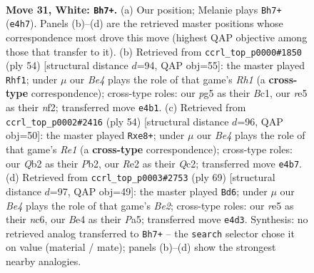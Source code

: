 \documentclass[11pt]{article}
\begin{document}
\clearpage

\begin{figure}[p]\centering
\begin{subfigure}{0.46\textwidth}\centering
\resizebox{\linewidth}{!}{%
\newchessgame
\chessboard[
  setfen={1nbq2k1/5p2/1p1P1n2/r3r1pp/p1P1B3/B5PP/PQ2RP2/R5K1 w - - 0 31},
  showmover=false,
  pgfstyle=straightmove, color=movearrow, markmove={e4-h7}
]}
\caption{}
\end{subfigure}\hfill
\begin{subfigure}{0.46\textwidth}\centering
\resizebox{\linewidth}{!}{%
\newchessgame
\chessboard[
  setfen={3k3r/2p1p1b1/8/r1qP1p1p/4p2P/1B3P2/1PP1QnP1/1KB1R2R w - - 3 28},
  showmover=false,
  pgfstyle=straightmove, color=movearrow, markmove={h1-f1}
]}
\caption{}
\end{subfigure}
\\[4pt]
\begin{subfigure}{0.46\textwidth}\centering
\resizebox{\linewidth}{!}{%
\newchessgame
\chessboard[
  setfen={3rr1k1/2q2pp1/p4n2/1pBp1P2/3b2Pp/5B1P/PPQ2P2/2R1R2K w - - 1 28},
  showmover=false,
  pgfstyle=straightmove, color=movearrow, markmove={e1-e8}
]}
\caption{}
\end{subfigure}\hfill
\begin{subfigure}{0.46\textwidth}\centering
\resizebox{\linewidth}{!}{%
\newchessgame
\chessboard[
  setfen={r3r1k1/1q2bp2/2N1p2p/pp6/3P1PPp/P4Q2/1PR4K/2R5 b - - 3 35},
  showmover=false,
  pgfstyle=straightmove, color=movearrow, markmove={e7-d6}
]}
\caption{}
\end{subfigure}
\caption{\textbf{Move 31, White: \texttt{Bh7+}.} (a) Our position; Melanie plays \texttt{Bh7+} (\texttt{e4h7}). Panels (b)--(d) are the retrieved master positions whose correspondence most drove this move (highest QAP objective among those that transfer to it). (b) Retrieved from \texttt{ccrl\_top\_p0000\#1850} (ply 54) [structural distance $d$=94, QAP obj=55]: the master played \texttt{Rhf1}; under $\mu$ our \emph{Be4} plays the role of that game's \emph{Rh1} (a \textbf{cross-type} correspondence); cross-type roles: our \emph{p}g5 as their \emph{B}c1, our \emph{r}e5 as their \emph{n}f2; transferred move \texttt{e4b1}. (c) Retrieved from \texttt{ccrl\_top\_p0002\#2416} (ply 54) [structural distance $d$=96, QAP obj=50]: the master played \texttt{Rxe8+}; under $\mu$ our \emph{Be4} plays the role of that game's \emph{Re1} (a \textbf{cross-type} correspondence); cross-type roles: our \emph{Q}b2 as their \emph{P}b2, our \emph{R}e2 as their \emph{Q}c2; transferred move \texttt{e4b7}. (d) Retrieved from \texttt{ccrl\_top\_p0003\#2753} (ply 69) [structural distance $d$=97, QAP obj=49]: the master played \texttt{Bd6}; under $\mu$ our \emph{Be4} plays the role of that game's \emph{Be2}; cross-type roles: our \emph{r}e5 as their \emph{n}c6, our \emph{B}e4 as their \emph{P}a5; transferred move \texttt{e4d3}. Synthesis: no retrieved analog transferred to \texttt{Bh7+} -- the \texttt{search} selector chose it on value (material / mate); panels (b)--(d) show the strongest nearby analogies.}
\label{fig:thought-m60}
\end{figure}
\end{document}
